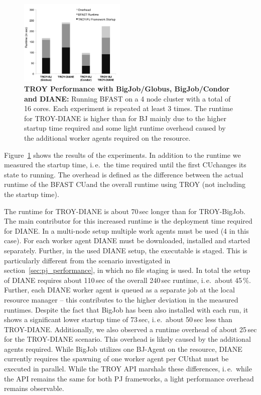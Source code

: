 \documentclass[conference,final]{IEEEtran}
\newcommand{\cu}{CU}
\newcommand{\up}{\vspace*{-1em}}
\begin{document}
\begin{figure}[t]
	\centering
		\includegraphics[width=0.45\textwidth]{figures/NewTROYData.pdf}
	\caption{\textbf{TROY Performance with BigJob/Globus, BigJob/Condor and 
	DIANE:} Running BFAST on a 4 node cluster with a total of 16 cores. Each 
	experiment is repeated at least 3 times. The runtime for TROY-DIANE is 
	higher than for BJ mainly due to the higher startup time required and some 
	light runtime overhead caused by the additional worker agents required on 
	the resource.\up\up}

	\label{fig:perf_perf-bfast-bj}
\end{figure}

Figure~\ref{fig:perf_perf-bfast-bj} shows the results of the experiments. In 
addition to the runtime we measured the startup time, i.\,e.\ the time required 
until the first \cu  changes its state to running. The overhead is defined as the 
difference between the actual runtime of the BFAST \cu  and the overall runtime 
using TROY (not including the startup time).

The runtime for TROY-DIANE is about 70\,sec longer than for TROY-BigJob. The 
main contributor for this increased runtime is the deployment time required for
DIANE. In a multi-node setup multiple work agents must be used (4 in this case).
For each worker agent DIANE must be downloaded, installed and started
separately. Further, in the used DIANE setup, the executable is staged. This is
particularly different from the scenario investigated in
section~\ref{sec:pj_performance}, in which no file staging is used. In total the
setup of DIANE requires about 110\,sec of the overall 240\,sec runtime, i.\,e.\
about 45\,\%. Further, each DIANE worker agent is queued as a separate job at
the local resource manager -- this contributes to the higher deviation in the
measured runtimes. Despite the fact that BigJob has been also installed with
each run, it shows a significant lower startup time of 73\,sec, i.\,e.\ about
50\,sec less than TROY-DIANE. Additionally, we also observed a runtime overhead
of about 25\,sec for the TROY-DIANE scenario. This overhead is likely caused by
the additional agents required. While BigJob utilizes one BJ-Agent on the 
resource, DIANE currently requires the spawning of one worker agent per \cu  that 
must be executed in parallel. While the TROY API marshals these differences, 
i.\,e.\ while the API remains the same for both PJ frameworks, a light 
performance overhead remains observable.
\end{document}
